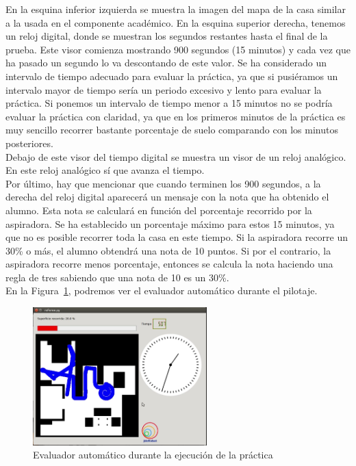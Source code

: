 En la esquina inferior izquierda se muestra la imagen del mapa de la casa similar a la usada en el componente académico. En la esquina superior derecha, tenemos un reloj digital, donde se muestran los segundos restantes hasta el final de la prueba. Este visor comienza mostrando 900 segundos (15 minutos) y cada vez que ha pasado un segundo lo va descontando de este valor. Se ha considerado un intervalo de tiempo adecuado para evaluar la práctica, ya que si pusiéramos un intervalo mayor de tiempo sería un periodo excesivo y lento para evaluar la práctica. Si ponemos un intervalo de tiempo menor a 15 minutos no se podría evaluar la práctica con claridad, ya que en los primeros minutos de la práctica es muy sencillo recorrer bastante porcentaje de suelo comparando con los minutos posteriores.\\

Debajo de este visor del tiempo digital se muestra un visor de un reloj analógico. En este reloj analógico sí que avanza el tiempo.\\


Por último, hay que mencionar que cuando terminen los 900 segundos, a la derecha del reloj digital aparecerá un mensaje con la nota que ha obtenido el alumno. Esta nota se calculará en función del porcentaje recorrido por la aspiradora. Se ha establecido un porcentaje máximo para estos 15 minutos, ya que no es posible recorrer toda la casa en este tiempo. Si la aspiradora recorre un 30\% o más, el alumno obtendrá una nota de 10 puntos. Si por el contrario, la aspiradora recorre menos porcentaje, entonces se calcula la nota haciendo una regla de tres sabiendo que una nota de 10 es un 30\%.\\

En la Figura~\ref{fig.Referee_Vacuum2}, podremos ver el evaluador automático durante el pilotaje.

\begin{figure}[H]
  \begin{center}
    \includegraphics[width=0.6\textwidth]{figures/Vacuum/Referee_Vacuum2.png}
		\caption{Evaluador automático durante la ejecución de la práctica}
		\label{fig.Referee_Vacuum2}
		\end{center}
\end{figure}


